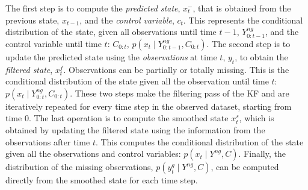 \documentclass{article}
\begin{document}
The first step is to compute the \textit{predicted state}, $x^-_t$, that is obtained from the previous state, $x_{t-1}$, and the \textit{control variable}, $c_t$. This represents the conditional distribution of the state, given all observations until time $t-1$, $Y^{ng}_{0:t-1}$, and the control variable until time $t$: $C_{0:t}$, $p(x_t \mid Y^{ng}_{0:t-1}, C_{0:t})$.
The second step is to update the predicted state using the \textit{observations} at time $t$, $y_t$, to obtain the \textit{filtered state}, $x^f_t$. Observations can be partially or totally missing. This is the conditional distribution of the state given all the observation until time $t$: $p(x_t \mid Y^{ng}_{0:t}, C_{0:t})$.
These two steps make the filtering pass of the KF and are iteratively repeated for every time step in the observed dataset, starting from time $0$.
The last operation is to compute the smoothed state $x^s_t$, which is obtained by updating the filtered state using the information from the observations after time $t$. This computes the conditional distribution of the state given all the observations and control variables: $p(x_t \mid Y^{ng}, C)$.
Finally, the distribution of the missing observations, $p(y^g_t \mid Y^{ng}, C)$, can be computed directly from the smoothed state for each time step.
\end{document}
